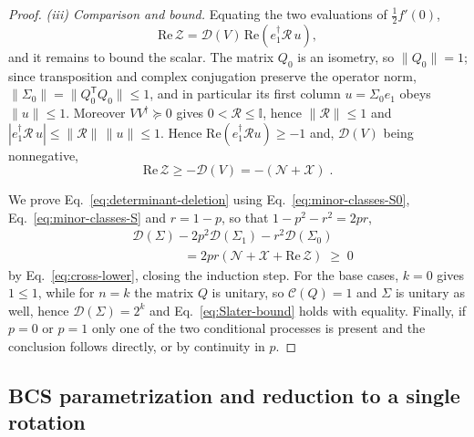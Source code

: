 \documentclass[aps,prl,twocolumn,superscriptaddress,reprint,longbibliography,nofootinbib]{revtex4-2}
\newcommand{\trans}{\mathsf{T}}
\begin{document}
\begin{proof}
\emph{(iii) Comparison and bound.} Equating the two evaluations of $\tfrac12f'(0)$,
\begin{equation}
    \mathrm{Re}\,\mathcal{Z}=\mathcal{D}(V)\,\mathrm{Re}\!\left(e_1^\dagger\mathcal{R}\,u\right),
\end{equation}
and it remains to bound the scalar. The matrix $Q_0$ is an isometry, so $\lVert Q_0\rVert=1$; since transposition and complex conjugation preserve the operator norm, $\lVert\Sigma_0\rVert=\lVert Q_0^{\trans}Q_0\rVert\le1$, and in particular its first column $u=\Sigma_0e_1$ obeys $\lVert u\rVert\le1$. Moreover $VV^\dagger\succeq0$ gives $0<\mathcal{R}\le\mathbb{I}$, hence $\lVert\mathcal{R}\rVert\le1$ and $|e_1^\dagger\mathcal{R}\,u|\le\lVert\mathcal{R}\rVert\,\lVert u\rVert\le1$.
Hence $\mathrm{Re}(e_1^\dagger\mathcal{R}u)\ge-1$ and, $\mathcal{D}(V)$ being nonnegative,
\begin{equation}
    \mathrm{Re}\,\mathcal{Z}\ge-\mathcal{D}(V)=-(\mathcal{N}+\mathcal{X})\;.
    \label{eq:cross-lower}
\end{equation}

We prove Eq.~\eqref{eq:determinant-deletion} using Eq.~\eqref{eq:minor-classes-S0}, Eq.~\eqref{eq:minor-classes-S} and $r=1-p$, so that $1-p^2-r^2=2pr$,
\begin{equation}
\begin{split}
    &\mathcal{D}(\Sigma)-2p^2\mathcal{D}(\Sigma_1)-r^2\mathcal{D}(\Sigma_0)\\
    &\qquad\qquad =2pr\left(\mathcal{N}+\mathcal{X}+\mathrm{Re}\,\mathcal{Z}\right)\;\ge\;0
    \end{split}
\end{equation} 
by Eq.~\eqref{eq:cross-lower}, closing the induction step. For the base cases, $k=0$ gives $1\le1$, while for $n=k$ the matrix $Q$ is unitary, so $\mathcal{C}(Q)=1$ and $\Sigma$ is unitary as well, hence $\mathcal{D}(\Sigma)=2^k$ and Eq.~\eqref{eq:Slater-bound} holds with equality. Finally, if $p=0$ or $p=1$ only one of the two conditional processes is present and the conclusion follows directly, or by continuity in $p$.
\end{proof}

\subsection{ BCS parametrization and reduction to a single rotation}
\label{app:proof:thouless}
\end{document}
